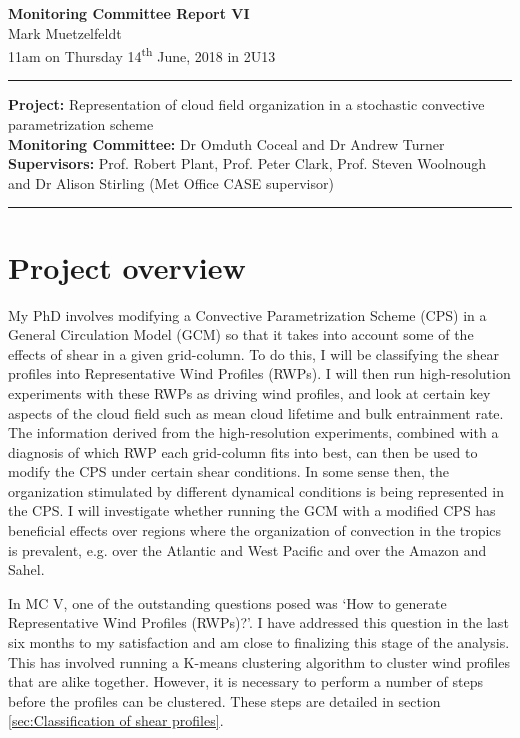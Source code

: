 \documentclass[11pt,a4paper]{article}
\newcommand{\ts}{\textsuperscript}
\begin{document}

\begin{center}
    \Large{\textbf{Monitoring Committee Report VI}}\\[0.1cm]
    \large{Mark Muetzelfeldt}\\
    \normalsize{11am on Thursday 14\ts{th} June, 2018 in 2U13}\\[0.1cm]		
    \rule{\textwidth}{0.2mm}
    \textbf{Project: }Representation of cloud field organization in a stochastic convective parametrization scheme\\
    \textbf{Monitoring Committee: }Dr Omduth Coceal and  Dr Andrew Turner\\
    \textbf{Supervisors: }Prof. Robert Plant, Prof. Peter Clark, Prof. Steven Woolnough \\
    and Dr Alison Stirling (Met Office CASE supervisor)\\
    \rule{\textwidth}{0.2mm}
\end{center}

\section{Project overview}
\label{sec:Project Overview}

My PhD involves modifying a Convective Parametrization Scheme (CPS) in a General Circulation Model (GCM) so that it takes into account some of the effects of shear in a given grid-column. To do this, I will be classifying the shear profiles into Representative Wind Profiles (RWPs). I will then run high-resolution experiments with these RWPs as driving wind profiles, and look at certain key aspects of the cloud field such as mean cloud lifetime and bulk entrainment rate. The information derived from the high-resolution experiments, combined with a diagnosis of which RWP each grid-column fits into best, can then be used to modify the CPS under certain shear conditions. In some sense then, the organization stimulated by different dynamical conditions is being represented in the CPS. I will investigate whether running the GCM with a modified CPS has beneficial effects over regions where the organization of convection in the tropics is prevalent, e.g. over the Atlantic and West Pacific and over the Amazon and Sahel.

In MC V, one of the outstanding questions posed was `How to generate Representative Wind Profiles (RWPs)?'. I have addressed this question in the last six months to my satisfaction and am close to finalizing this stage of the analysis. This has involved running a K-means clustering algorithm to cluster wind profiles that are alike together. However, it is necessary to perform a number of steps before the profiles can be clustered. These steps are detailed in section \ref{sec:Classification of shear profiles}.
\end{document}
